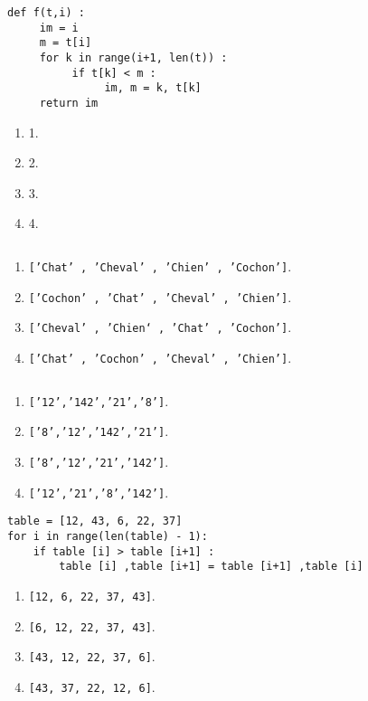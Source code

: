 \begin{multicols}{2}
\begin{lstlisting}
def f(t,i) :
     im = i
     m = t[i]
     for k in range(i+1, len(t)) :
          if t[k] < m :
               im, m = k, t[k]
     return im
\end{lstlisting}
\begin{enumerate}
\item 1.
\item 2. %
\item 3.
\item 4.
\end{enumerate}

\begin{lstlisting}
\end{lstlisting}
\begin{enumerate}
\item \texttt{['Chat' , 'Cheval' , 'Chien' , 'Cochon']}. %
\item \texttt{['Cochon' , 'Chat' , 'Cheval' , 'Chien']}.
\item \texttt{['Cheval' , 'Chien‘ , 'Chat' , 'Cochon']}.
\item \texttt{['Chat' , 'Cochon' , 'Cheval' , 'Chien']}.
\end{enumerate}

\begin{lstlisting}
\end{lstlisting}
\begin{enumerate}
\item \texttt{['12','142','21','8']}. %
\item \texttt{['8','12','142','21']}.
\item \texttt{['8','12','21','142']}.
\item \texttt{['12','21','8','142']}.
\end{enumerate}

\begin{lstlisting}
table = [12, 43, 6, 22, 37]
for i in range(len(table) - 1):
    if table [i] > table [i+1] :
        table [i] ,table [i+1] = table [i+1] ,table [i]
\end{lstlisting}
\begin{enumerate}
\item \texttt{[12, 6, 22, 37, 43]}.%
\item \texttt{[6, 12, 22, 37, 43]}.
\item \texttt{[43, 12, 22, 37, 6]}.
\item \texttt{[43, 37, 22, 12, 6]}.
\end{enumerate}


\end{multicols}
